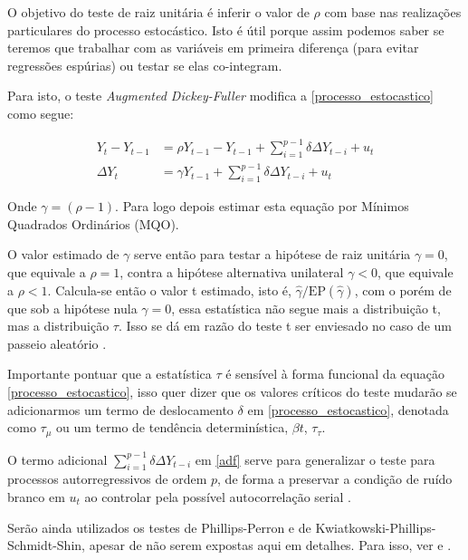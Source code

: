 \documentclass[a4paper,
               article,
               12pt,
               openany,
               oneside,
               english,
               brazil]{abntex2}
\numberwithin{equation}{section}
\begin{document}
    O objetivo do teste de raiz unitária é inferir o valor de $ \rho $ com base nas realizações particulares do processo estocástico. Isto é útil porque assim podemos saber se teremos que trabalhar com as variáveis em primeira diferença (para evitar regressões espúrias) ou testar se elas co-integram.
    
    Para isto, o teste \textit{Augmented Dickey-Fuller} modifica a \autoref{processo_estocastico} como segue:

    \begin{align}
        \label{adf}
        Y_t - Y_{t-1} &= \rho Y_{t-1} - Y_{t-1} + \sum_{i = 1}^{p-1}\delta \Delta Y_{t-i} + u_t \nonumber \\
        \Delta Y_t &= \gamma Y_{t-1} + \sum_{i = 1}^{p-1}\delta \Delta Y_{t-i} + u_t
    \end{align}

    Onde $ \gamma = (\rho - 1) $. Para logo depois estimar esta equação por Mínimos Quadrados Ordinários (MQO).
   
    O valor estimado de $ \gamma $ serve então para testar a hipótese de raiz unitária $ \gamma = 0 $, que equivale a $ \rho = 1 $, contra a hipótese alternativa unilateral $ \gamma < 0 $, que equivale a $ \rho < 1 $. Calcula-se então o valor t estimado, isto é, $ \hat{\gamma} / \text{EP}(\hat{\gamma}) $, com o porém de que sob a hipótese nula $ \gamma = 0 $, essa estatística não segue mais a distribuição t, mas a distribuição $ \tau $. Isso se dá em razão do teste t ser enviesado no caso de um passeio aleatório \cite[p.~748-749]{gujarati}.

    Importante pontuar que a estatística $ \tau $ é sensível à forma funcional da equação \eqref{processo_estocastico}, isso quer dizer que os valores críticos do teste mudarão se adicionarmos um termo de deslocamento $ \delta $ em \eqref{processo_estocastico}, denotada como $ \tau_{\mu} $ ou um termo de tendência determinística, $ \beta t $, $ \tau_{\tau} $.
   
    O termo adicional $ \sum_{i = 1}^{p-1}\delta \Delta Y_{t-i} $ em \eqref{adf} serve para generalizar o teste para processos autorregressivos de ordem $ p $, de forma a preservar a condição de ruído branco em $ u_t $ ao controlar pela possível autocorrelação serial \cite[p.~40]{gustavo}.

    Serão ainda utilizados os testes de Phillips-Perron e de Kwiatkowski-Phillips-Schmidt-Shin, apesar de não serem expostas aqui em detalhes. Para isso, ver \textcite{pp} e \textcite{kpss}.
\end{document}
